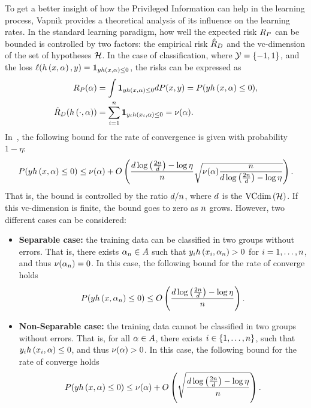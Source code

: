 To get a better insight of how the Privileged Information can help in the learning process, Vapnik provides a theoretical analysis of its influence on the learning rates.
In the standard learning paradigm, how well the expected risk $R_P$ can be bounded is controlled by two factors: the empirical risk $\hat{R}_{D}$ and the \acrshort{vc}-dimension of the set of hypotheses $\mathcal{\mathcal{H}}$.
In the case of classification, where $\mathcal{Y} = \left\{-1, 1\right\}$, and the loss $\ell(h\left(x, \alpha\right), y) = \bm{1}_{y h\left(x, \alpha\right) \leq 0}$, the risks can be expressed as
\begin{align*}
    \nonumber
    R_P (\alpha) &= \int \bm{1}_{y h\left(x, \alpha\right) \leq 0} dP(x, y) =  P(y h\left(x, \alpha\right) \leq 0) ,\\
    \hat{R}_{D}(h\left(\cdot, \alpha\right)) &= \sum_{i=1}^n \bm{1}_{y_i h\left(x_i, \alpha\right) \leq 0} = \nu(\alpha).
\end{align*}
In~\cite[Theorem~6.8]{vapnik1982estimation}, the following bound for the rate of convergence is given with probability $1 - \eta$:
\begin{equation}
    \nonumber
    P(y h\left(x, \alpha\right) \leq 0) \leq \nu(\alpha) + O\left( \frac{d \log\left(\frac{2n}{d} \right) - \log\eta}{n} \sqrt{\nu(\alpha) \frac{n}{d \log\left(\frac{2n}{d} \right) - \log\eta}}  \right) .
\end{equation}
That is, the bound is controlled by the ratio $d/n$, where $d$ is the $\operatorname{VCdim}\left(\mathcal{H}\right)$. If this \acrshort{vc}-dimension is finite, the bound goes to zero as $n$ grows.
However, two different cases can be considered:
\begin{itemize}
    \item \textbf{Separable case:} the training data can be classified in two groups without errors. That is, there exists $\alpha_n \in A$ such that $y_i h\left(x_i, \alpha_n\right) > 0$ for $i = 1, \ldots, n$, and thus $\nu(\alpha_n) = 0$.
    In this case, the following bound for the rate of converge holds
    \begin{equation}
        \nonumber
        P(y h\left(x, \alpha_n\right) \leq 0) \leq O\left( \frac{d \log\left(\frac{2n}{d} \right) - \log\eta}{n}  \right) .
    \end{equation}
    \item \textbf{Non-Separable case:} the training data cannot be classified in two groups without errors. That is, for all $\alpha \in A$, there exists $i \in \left\{1, \ldots, n\right\}$, such that $y_i h\left(x_i, \alpha\right) \leq 0$, and thus $\nu(\alpha) > 0$.
    In this case, the following bound for the rate of converge holds
    \begin{equation}
        \nonumber
        P(y h\left(x, \alpha\right) \leq 0) \leq \nu(\alpha) + O\left( \sqrt{\frac{d \log\left(\frac{2n}{d} \right) - \log\eta}{n}}  \right) .
    \end{equation}
\end{itemize}
